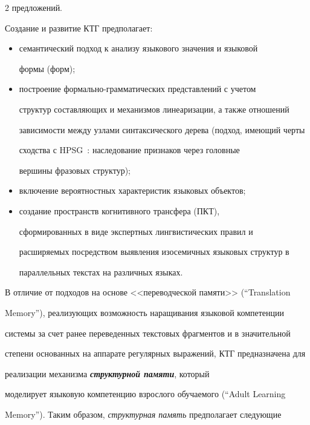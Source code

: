 \begin{multicols}{2}
предложений.





Создание и развитие КТГ предполагает:


\begin{itemize}


\item семантический подход к анализу языкового значения и языковой


формы (форм);


\item построение формально-грамматических представлений с учетом


структур составляющих и механизмов линеаризации, а также отношений


зависимости между узлами синтаксического дерева (подход, имеющий черты


сходства с HPSG~\cite{10koz}: наследование признаков через головные


вершины фразовых структур);


\item  включение вероятностных характеристик языковых объектов;


\item создание пространств когнитивного трансфера (ПКТ),


сформированных в виде экспертных лингвистических правил и


расширяемых посредством выявления  изосемичных языковых структур в


параллельных текстах на различных языках.


\end{itemize}





В отличие от подходов на основе <<переводческой памяти>> (``Translation


Memory''), реа\-ли\-зу\-ющих возможность наращивания языковой компетенции


сис\-те\-мы за счет ранее переведенных текстовых фрагментов и в значительной


степени основанных на аппарате регулярных выражений, КТГ предназначена для 


реализации механизма {\bfseries\textit{структурной памяти}},  который 


моделирует языковую компетенцию взрослого обучаемого (``Adult Learning 


Memory''). Таким образом, \textit{структурная память} предполагает следующие 



\end{multicols}

